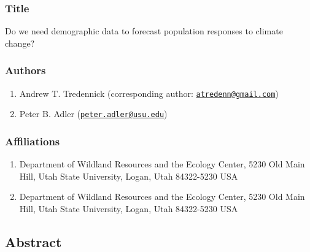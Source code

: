 \documentclass[12pt,]{article}
\title{}
\author{}
\date{}
\begin{document}
\maketitle


\subsubsection{Title}\label{title}

Do we need demographic data to forecast population responses to climate
change?

\subsubsection{Authors}\label{authors}

\begin{enumerate}
\def\labelenumi{\arabic{enumi}.}
\itemsep1pt\parskip0pt
\item
  Andrew T. Tredennick (corresponding author:
  \href{mailto:atredenn@gmail.com}{\nolinkurl{atredenn@gmail.com}})
\item
  Peter B. Adler
  (\href{mailto:peter.adler@usu.edu}{\nolinkurl{peter.adler@usu.edu}})
\end{enumerate}

\subsubsection{Affiliations}\label{affiliations}

\begin{enumerate}
\def\labelenumi{\arabic{enumi}.}
\itemsep1pt\parskip0pt
\item
  Department of Wildland Resources and the Ecology Center, 5230 Old Main
  Hill, Utah State University, Logan, Utah 84322-5230 USA
\item
  Department of Wildland Resources and the Ecology Center, 5230 Old Main
  Hill, Utah State University, Logan, Utah 84322-5230 USA
\end{enumerate}

\newpage{}

\subsection{Abstract}\label{abstract}
\end{document}
